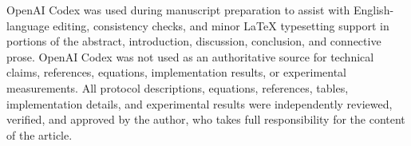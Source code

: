 \documentclass[preprint,12pt]{elsarticle}
\theoremstyle{remark}
\begin{document}
OpenAI Codex was used during manuscript preparation to assist with
English-language editing, consistency checks, and minor \LaTeX{}
typesetting support in portions of the abstract, introduction,
discussion, conclusion, and connective prose. OpenAI Codex was not used
as an authoritative source for technical claims, references, equations,
implementation results, or experimental measurements. All protocol
descriptions, equations, references, tables, implementation details, and
experimental results were independently reviewed, verified, and approved
by the author, who takes full responsibility for the content of the
article.

\end{document}
